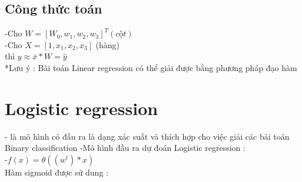 \documentclass{article}
\begin{document}
 \subsection{Công thức toán}
-Cho $W = [W_0,w_{1},w_{2},w_{3}]^T (cột)$ \\
-Cho $X= [1,x_{1},x_{2},x_{3}]$ (hàng)  \\
thì $y \approx \bar{x}*W = \hat{y}$  \\
*Lưu ý : Bài toán Linear regression có thể giải được bằng phương pháp đạo hàm \\ 
\section{Logistic regression}
 - là  mô hình có đầu ra là dạng xác suất  và thích hợp cho việc giải các bài toán Binary classification 
-Mô hình đầu ra dự đoán Logistic regression : \\
-$f(x) = \theta((w^t)*x)$ \\
Hàm sigmoid được sử dung : 
\end{document}
